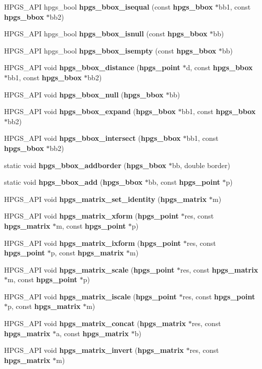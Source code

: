 \begin{DoxyCompactItemize}
\item 
HPGS\_\-API hpgs\_\-bool {\bf hpgs\_\-bbox\_\-isequal} (const {\bf hpgs\_\-bbox} $\ast$bb1, const {\bf hpgs\_\-bbox} $\ast$bb2)
\item 
HPGS\_\-API hpgs\_\-bool {\bf hpgs\_\-bbox\_\-isnull} (const {\bf hpgs\_\-bbox} $\ast$bb)
\item 
HPGS\_\-API hpgs\_\-bool {\bf hpgs\_\-bbox\_\-isempty} (const {\bf hpgs\_\-bbox} $\ast$bb)
\item 
HPGS\_\-API void {\bf hpgs\_\-bbox\_\-distance} ({\bf hpgs\_\-point} $\ast$d, const {\bf hpgs\_\-bbox} $\ast$bb1, const {\bf hpgs\_\-bbox} $\ast$bb2)
\item 
HPGS\_\-API void {\bf hpgs\_\-bbox\_\-null} ({\bf hpgs\_\-bbox} $\ast$bb)
\item 
HPGS\_\-API void {\bf hpgs\_\-bbox\_\-expand} ({\bf hpgs\_\-bbox} $\ast$bb1, const {\bf hpgs\_\-bbox} $\ast$bb2)
\item 
HPGS\_\-API void {\bf hpgs\_\-bbox\_\-intersect} ({\bf hpgs\_\-bbox} $\ast$bb1, const {\bf hpgs\_\-bbox} $\ast$bb2)
\item 
static void {\bf hpgs\_\-bbox\_\-addborder} ({\bf hpgs\_\-bbox} $\ast$bb, double border)
\item 
static void {\bf hpgs\_\-bbox\_\-add} ({\bf hpgs\_\-bbox} $\ast$bb, const {\bf hpgs\_\-point} $\ast$p)
\item 
HPGS\_\-API void {\bf hpgs\_\-matrix\_\-set\_\-identity} ({\bf hpgs\_\-matrix} $\ast$m)
\item 
HPGS\_\-API void {\bf hpgs\_\-matrix\_\-xform} ({\bf hpgs\_\-point} $\ast$res, const {\bf hpgs\_\-matrix} $\ast$m, const {\bf hpgs\_\-point} $\ast$p)
\item 
HPGS\_\-API void {\bf hpgs\_\-matrix\_\-ixform} ({\bf hpgs\_\-point} $\ast$res, const {\bf hpgs\_\-point} $\ast$p, const {\bf hpgs\_\-matrix} $\ast$m)
\item 
HPGS\_\-API void {\bf hpgs\_\-matrix\_\-scale} ({\bf hpgs\_\-point} $\ast$res, const {\bf hpgs\_\-matrix} $\ast$m, const {\bf hpgs\_\-point} $\ast$p)
\item 
HPGS\_\-API void {\bf hpgs\_\-matrix\_\-iscale} ({\bf hpgs\_\-point} $\ast$res, const {\bf hpgs\_\-point} $\ast$p, const {\bf hpgs\_\-matrix} $\ast$m)
\item 
HPGS\_\-API void {\bf hpgs\_\-matrix\_\-concat} ({\bf hpgs\_\-matrix} $\ast$res, const {\bf hpgs\_\-matrix} $\ast$a, const {\bf hpgs\_\-matrix} $\ast$b)
\item 
HPGS\_\-API void {\bf hpgs\_\-matrix\_\-invert} ({\bf hpgs\_\-matrix} $\ast$res, const {\bf hpgs\_\-matrix} $\ast$m)

\end{DoxyCompactItemize}
